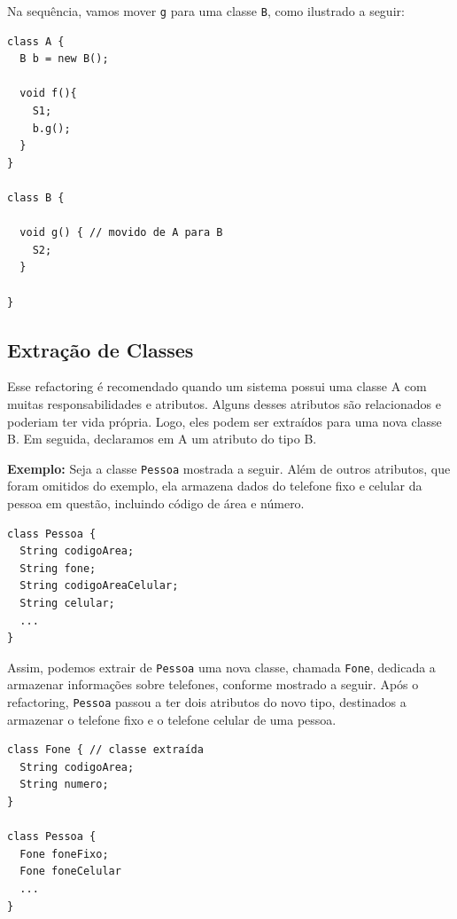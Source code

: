\documentclass[
  11pt,
  twoside]{book}
\newcommand{\passthrough}[1]{#1}
\begin{document}
Na sequência, vamos mover \passthrough{\lstinline!g!} para uma classe
\passthrough{\lstinline!B!}, como ilustrado a seguir:

\begin{lstlisting}
class A {
  B b = new B();

  void f(){
    S1;
    b.g();
  }
}

class B {

  void g() { // movido de A para B
    S2;
  }

}
\end{lstlisting}

\hypertarget{extrauxe7uxe3o-de-classes}{%
\subsection{Extração de Classes}\label{extrauxe7uxe3o-de-classes}}


Esse refactoring é recomendado quando um sistema possui uma classe A com
muitas responsabilidades e atributos. Alguns desses atributos são
relacionados e poderiam ter vida própria. Logo, eles podem ser extraídos
para uma nova classe B. Em seguida, declaramos em A um atributo do tipo
B.

\textbf{Exemplo:} Seja a classe \passthrough{\lstinline!Pessoa!}
mostrada a seguir. Além de outros atributos, que foram omitidos do
exemplo, ela armazena dados do telefone fixo e celular da pessoa em
questão, incluindo código de área e número.

\begin{lstlisting}
class Pessoa {
  String codigoArea;
  String fone;
  String codigoAreaCelular;
  String celular;
  ...
}
\end{lstlisting}

Assim, podemos extrair de \passthrough{\lstinline!Pessoa!} uma nova
classe, chamada \passthrough{\lstinline!Fone!}, dedicada a armazenar
informações sobre telefones, conforme mostrado a seguir. Após o
refactoring, \passthrough{\lstinline!Pessoa!} passou a ter dois
atributos do novo tipo, destinados a armazenar o telefone fixo e o
telefone celular de uma pessoa.

\begin{lstlisting}
class Fone { // classe extraída
  String codigoArea;
  String numero; 
}

class Pessoa {
  Fone foneFixo;
  Fone foneCelular
  ...
}
\end{lstlisting}
\end{document}
